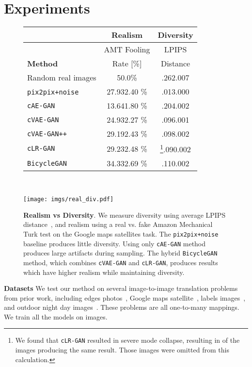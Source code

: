 \documentclass{article}
\newcommand{\ppn}{\texttt{pix2pix+noise}\xspace}
\newcommand{\cinfogan}{\texttt{cLR-GAN}\xspace}
\newcommand{\cae}{\texttt{cAE-GAN}\xspace}
\newcommand{\cvaegan}{\texttt{cVAE-GAN}\xspace}
\newcommand{\cvaeganp}{\texttt{cVAE-GAN++}\xspace}
\newcommand{\bicycle}{\texttt{BicycleGAN}\xspace} \newcommand{\G}{G\xspace}
\begin{document}
\section{Experiments}
\label{sec:exp}
\begin{figure}
  \centering
  \begin{minipage}[b]{0.54\linewidth}  
  \scalebox{0.92} {
  \begin{tabular}{l c c}
	& \textbf{Realism} & \textbf{Diversity} \\ \hline
	& AMT Fooling & LPIPS \\
	\textbf{Method} & Rate [\%] & Distance \\ \hline
	Random real images & 50.0\% & .262.007 \\ \hline
	\ppn~\citep{isola2016image} & 27.932.40 \% & .013.000 \\
	\cae & 13.641.80 \% & .204.002 \\
	\cvaegan & 24.932.27 \% & .096.001 \\
	\cvaeganp & 29.192.43 \% & .098.002 \\
	\cinfogan & 29.232.48 \% & \footnote{We found that \cinfogan resulted in severe mode collapse, resulting in  of the images producing the same result. Those images were omitted from this calculation.}.090.002 \\
	\bicycle & 34.332.69 \% & .110.002 \\ \hline
	\end{tabular} } \\
	
  \end{minipage}
  \begin{minipage}[b]{0.45\linewidth}
  \texttt{[image: imgs/real\_div.pdf]} 
  \end{minipage}
  \vspace{-4mm}
  \caption{\small \textbf{Realism vs Diversity}. We measure diversity using average LPIPS distance~\cite{zhang2018unreasonable}, and realism using a real vs. fake Amazon Mechanical Turk test on the Google maps  satellites task. The \ppn baseline produces little diversity. Using only \cae method produces large artifacts during sampling. The hybrid \bicycle method, which combines \cvaegan and \cinfogan, produces results which have higher realism while maintaining diversity.
  }
  \vspace{-5mm}
  \label{fig:real_vs_div}
\end{figure}


{\bf Datasets} We test our method on several image-to-image translation problems from prior work, including edges  photos~\citep{yu2014fine,zhu2016generative}, Google maps  satellite~\citep{isola2016image}, labels  images~\citep{Cordts2016Cityscapes}, and outdoor night  day images~\citep{Laffont14}. These problems are all one-to-many mappings. We train all the models on  images.
\end{document}
